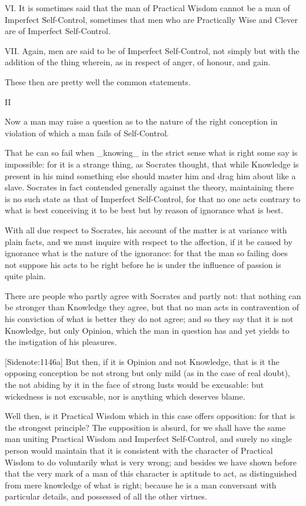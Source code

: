 VI. It is sometimes said that the man of Practical Wisdom cannot be a
man of Imperfect Self-Control, sometimes that men who are Practically
Wise and Clever are of Imperfect Self-Control.

VII. Again, men are said to be of Imperfect Self-Control, not simply
but with the addition of the thing wherein, as in respect of anger, of
honour, and gain.

These then are pretty well the common statements.

II

Now a man may raise a question as to the nature of the right conception
in violation of which a man fails of Self-Control.

That he can so fail when _knowing_ in the strict sense what is right
some say is impossible: for it is a strange thing, as Socrates thought,
that while Knowledge is present in his mind something else should
master him and drag him about like a slave. Socrates in fact contended
generally against the theory, maintaining there is no such state as that
of Imperfect Self-Control, for that no one acts contrary to what is best
conceiving it to be best but by reason of ignorance what is best.

With all due respect to Socrates, his account of the matter is at
variance with plain facts, and we must inquire with respect to the
affection, if it be caused by ignorance what is the nature of the
ignorance: for that the man so failing does not suppose his acts to be
right before he is under the influence of passion is quite plain.

There are people who partly agree with Socrates and partly not: that
nothing can be stronger than Knowledge they agree, but that no man acts
in contravention of his conviction of what is better they do not agree;
and so they say that it is not Knowledge, but only Opinion, which the
man in question has and yet yields to the instigation of his pleasures.

[Sidenote:1146a] But then, if it is Opinion and not Knowledge, that is
it the opposing conception be not strong but only mild (as in the case
of real doubt), the not abiding by it in the face of strong lusts would
be excusable: but wickedness is not excusable, nor is anything which
deserves blame.

Well then, is it Practical Wisdom which in this case offers opposition:
for that is the strongest principle? The supposition is absurd, for
we shall have the same man uniting Practical Wisdom and Imperfect
Self-Control, and surely no single person would maintain that it is
consistent with the character of Practical Wisdom to do voluntarily what
is very wrong; and besides we have shown before that the very mark of
a man of this character is aptitude to act, as distinguished from
mere knowledge of what is right; because he is a man conversant with
particular details, and possessed of all the other virtues.

